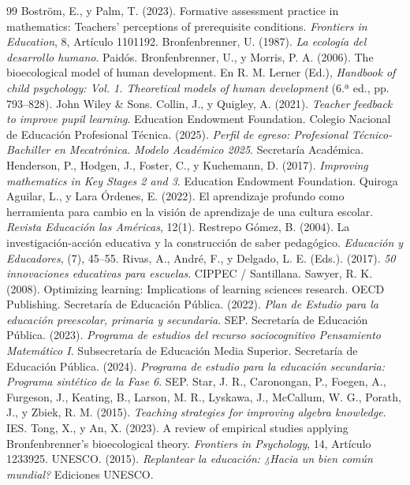 \documentclass[spanish,letterpaper,oneside]{article}
\begin{document}
\clearpage
\begin{thebibliography}{99}
 Boström, E., y Palm, T. (2023). Formative assessment practice in mathematics: Teachers' perceptions of prerequisite conditions. \textit{Frontiers in Education}, 8, Artículo 1101192.
 Bronfenbrenner, U. (1987). \textit{La ecología del desarrollo humano}. Paidós.
 Bronfenbrenner, U., y Morris, P. A. (2006). The bioecological model of human development. En R. M. Lerner (Ed.), \textit{Handbook of child psychology: Vol. 1. Theoretical models of human development} (6.ª ed., pp. 793--828). John Wiley \& Sons.
 Collin, J., y Quigley, A. (2021). \textit{Teacher feedback to improve pupil learning}. Education Endowment Foundation.
 Colegio Nacional de Educación Profesional Técnica. (2025). \textit{Perfil de egreso: Profesional Técnico-Bachiller en Mecatrónica. Modelo Académico 2025}. Secretaría Académica.
 Henderson, P., Hodgen, J., Foster, C., y Kuchemann, D. (2017). \textit{Improving mathematics in Key Stages 2 and 3}. Education Endowment Foundation.
 Quiroga Aguilar, L., y Lara Órdenes, E. (2022). El aprendizaje profundo como herramienta para cambio en la visión de aprendizaje de una cultura escolar. \textit{Revista Educación las Américas}, 12(1).
 Restrepo Gómez, B. (2004). La investigación-acción educativa y la construcción de saber pedagógico. \textit{Educación y Educadores}, (7), 45--55.
 Rivas, A., André, F., y Delgado, L. E. (Eds.). (2017). \textit{50 innovaciones educativas para escuelas}. CIPPEC / Santillana.
 Sawyer, R. K. (2008). Optimizing learning: Implications of learning sciences research. OECD Publishing.
 Secretaría de Educación Pública. (2022). \textit{Plan de Estudio para la educación preescolar, primaria y secundaria}. SEP.
 Secretaría de Educación Pública. (2023). \textit{Programa de estudios del recurso sociocognitivo Pensamiento Matemático I}. Subsecretaría de Educación Media Superior.
 Secretaría de Educación Pública. (2024). \textit{Programa de estudio para la educación secundaria: Programa sintético de la Fase 6}. SEP.
 Star, J. R., Caronongan, P., Foegen, A., Furgeson, J., Keating, B., Larson, M. R., Lyskawa, J., McCallum, W. G., Porath, J., y Zbiek, R. M. (2015). \textit{Teaching strategies for improving algebra knowledge}. IES.
 Tong, X., y An, X. (2023). A review of empirical studies applying Bronfenbrenner's bioecological theory. \textit{Frontiers in Psychology}, 14, Artículo 1233925.
 UNESCO. (2015). \textit{Replantear la educación: ¿Hacia un bien común mundial?} Ediciones UNESCO.
\end{thebibliography}
\end{document}
